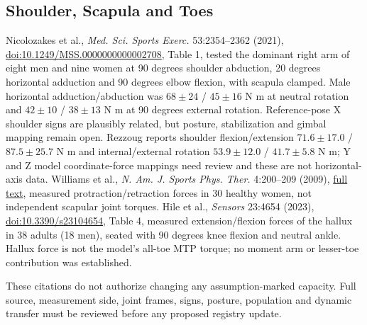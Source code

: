 \documentclass{article}
\begin{document}
\subsection{Shoulder, Scapula and Toes}
Nicolozakes et al., \emph{Med. Sci. Sports Exerc.} 53:2354--2362 (2021),
\href{https://doi.org/10.1249/MSS.0000000000002708}{doi:10.1249/MSS.0000000000002708},
Table 1, tested the dominant right arm of eight men and nine women at 90 degrees
shoulder abduction, 20 degrees horizontal adduction and 90 degrees elbow
flexion, with scapula clamped. Male horizontal adduction/abduction was
$68\pm24$ / $45\pm16$ N m at neutral rotation and $42\pm10$ / $38\pm13$ N m
at 90 degrees external rotation. Reference-pose X shoulder signs are
plausibly related, but posture, stabilization and gimbal mapping remain open.
Rezzoug reports shoulder flexion/extension $71.6\pm17.0$ / $87.5\pm25.7$ N m
and internal/external rotation $53.9\pm12.0$ / $41.7\pm5.8$ N m; Y and Z model
coordinate-force mappings need review and these are not horizontal-axis data.
Williams et al., \emph{N. Am. J. Sports Phys. Ther.} 4:200--209 (2009),
\href{https://pmc.ncbi.nlm.nih.gov/articles/PMC2953350/}{full text}, measured
protraction/retraction forces in 30 healthy women, not independent scapular
joint torques. Hile et al., \emph{Sensors} 23:4654 (2023),
\href{https://doi.org/10.3390/s23104654}{doi:10.3390/s23104654}, Table 4,
measured extension/flexion forces of the hallux in 38 adults (18 men), seated
with 90 degrees knee flexion and neutral ankle. Hallux force is not the model's
all-toe MTP torque; no moment arm or lesser-toe contribution was established.

These citations do not authorize changing any assumption-marked capacity.
Full source, measurement side, joint frames, signs, posture, population and
dynamic transfer must be reviewed before any proposed registry update.
\end{document}
